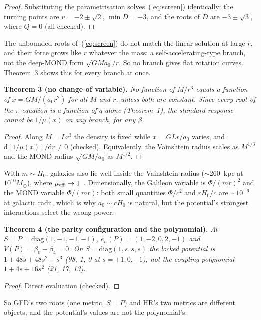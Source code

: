 \documentclass[twocolumn]{iopjournal}
\begin{document}
\begin{proof}
Substituting the parametrisation solves~(\ref{eq:screen}) identically;
the turning points are $v = -2\pm\sqrt2$, $\min D = -3$, and the
roots of $D$ are $-3\pm\sqrt3$, where $Q = 0$ (all checked).
\end{proof}

The unbounded roots of~(\ref{eq:screen}) do not match the linear solution at large
$r$, and their force grows like $r$ whatever the mass: a
self-accelerating-type branch, not the deep-MOND form
$\sqrt{GMa_0}/r$. So no branch gives flat rotation curves. Theorem~3
shows this for every branch at once.

\textbf{Theorem 3 (no change of variable).} \emph{No function of
$M/r^3$ equals a function of $x = GM/(a_0r^2)$ for all $M$ and $r$,
unless both are constant. Since every root of the $\pi$-equation is a
function of $q$ alone (Theorem~1), the standard response cannot be
$1/\mu(x)$ on any branch, for any $\beta$.}

\begin{proof}
Along $M = Lr^3$ the density is fixed while $x = GLr/a_0$ varies, and
$\mathrm d[1/\mu(x)]/\mathrm dr \neq 0$ (checked). Equivalently, the
Vainshtein radius scales as $M^{1/3}$ and the MOND radius
$\sqrt{GM/a_0}$ as $M^{1/2}$.
\end{proof}

With $m\sim H_0$, galaxies also lie well
inside the Vainshtein radius ($\sim$260~kpc at $10^{10}M_\odot$), where
$\mu_{\rm eff}\to1$~\cite{NelsonBimetric}. Dimensionally, the Galileon
variable is $\Phi/(mr)^2$ and the MOND variable $\Phi/(mr)$: both small
quantities $\Phi/c^2$ and $rH_0/c$ are $\sim10^{-6}$ at galactic radii,
which is why $a_0\sim cH_0$ is natural, but the potential's strongest
interactions select the wrong power.

\textbf{Theorem 4 (the parity configuration and the polynomial).}
\emph{At $S = P = \mathrm{diag}(1,-1,-1,-1)$, $e_n(P) = (1,-2,0,2,-1)$
and $V(P) = \beta_0 - \beta_4 = 0$. On $S = \mathrm{diag}(1,s,s,s)$ the
locked potential is $1 + 48s + 48s^2 + s^3$ (98, 1, 0 at
$s = +1, 0, -1$), not the coupling polynomial $1 + 4s + 16s^2$
(21, 17, 13).}

\begin{proof}
Direct evaluation (checked).
\end{proof}

So GFD's two roots (one metric, $S = P$) and HR's two metrics are
different objects, and the potential's values are not the polynomial's.
\end{document}
